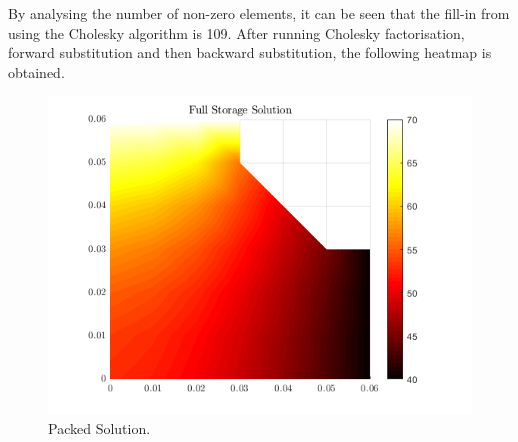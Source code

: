 \documentclass[12pt,a4paper]{article}
\begin{document}
By analysing the number of non-zero elements, it can be seen that the fill-in from using the Cholesky algorithm is 109. After running Cholesky factorisation, forward substitution and then backward substitution, the following heatmap is obtained.
\begin{figure}[H]
	\includegraphics[width=\linewidth]{images/fullSolution.png}
	\caption{Packed Solution.}
	\label{fig:packed}
\end{figure}
\end{document}
